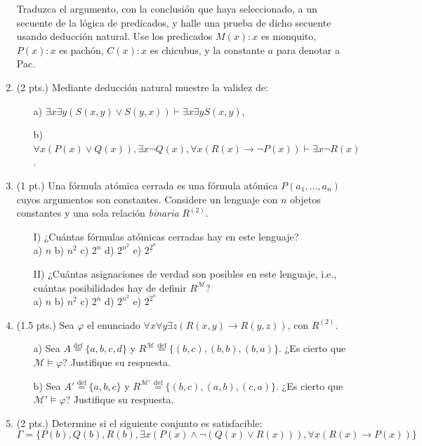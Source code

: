 \documentclass[12pt,letterpaper]{article}
\begin{document}
\begin{enumerate}
  Traduzca el argumento, con la conclusión que haya seleccionado, a un secuente de la lógica de predicados, y halle una prueba de dicho secuente usando deducción natural. Use los predicados $M(x) : x$ es monquito, $P(x) : x$ es pachón, $C(x) : x$ es chicubus, y la constante $a$ para denotar a Pac.
  \bigskip
  \bigskip
  
\item (2 pts.) Mediante deducción natural muestre la validez de:
  \begin{enumerate}
  \item[a)] $\exists x \exists y(S(x,y) \lor S(y,x)) \vdash \exists x \exists y S(x,y)$,
  \item[b)] $\forall x(P(x) \lor Q(x)), \exists x \neg Q(x), \forall x(R(x) \to \neg P(x)) \vdash \exists x \neg R(x)$.
  \end{enumerate}
  \bigskip
  \bigskip
    
\item (1 pt.) Una fórmula atómica cerrada es una fórmula atómica $P(a_1, \dots, a_n)$ cuyos argumentos son constantes. Considere un lenguaje con $n$ objetos constantes y una sola relación \textit{binaria} $R^{(2)}$.
  \begin{enumerate}
  \item[\footnotesize I)] ¿Cuántas fórmulas atómicas cerradas hay en este lenguaje?\\
    a) $n$ \hfill
    b) $n^2$ \hfill
    c) $2^n$ \hfill
    d) $2^{n^2}$ \hfill
    e) $2^{2^n}$

  \item[\footnotesize II)] ¿Cuántas asignaciones de verdad son posibles en este lenguaje, i.e., cuántas posibilidades hay de definir $R^{\mathcal{M}}$?\\
    a) $n$ \hfill
    b) $n^2$ \hfill
    c) $2^n$ \hfill
    d) $2^{n^2}$ \hfill
    e) $2^{2^n}$
  \end{enumerate}
  \bigskip
  \bigskip
  
\item (1.5 pts.) Sea $\varphi$ el enunciado $\forall x \forall y \exists z (R(x,y) \to R(y,z))$, con $R^{(2)}$.
  \begin{enumerate}
  \item[a)] Sea $A \overset{\text{def}}{=} \{a,b,c,d\}$ y $R^{\mathcal{M}} \overset{\text{def}}{=} \{(b,c), (b,b), (b,a)\}$. ¿Es cierto que $\mathcal{M} \models \varphi$? Justifique su respuesta.
  \item[b)] Sea $A' \overset{\text{def}}{=} \{a,b,c\}$ y $R^{\mathcal{M}'} \overset{\text{def}}{=} \{(b,c), (a,b), (c,a)\}$. ¿Es cierto que $\mathcal{M}' \models \varphi$? Justifique su respuesta.
  \end{enumerate}
  \bigskip
  \bigskip
  
\item (2 pts.) Determine si el siguiente conjunto es satisfacible:
  \[
  \Gamma = \{P(b), Q(b), R(b), \exists x(P(x) \land \neg(Q(x) \lor R(x))), \forall x(R(x) \to P(x))\}
  \]
  \bigskip
  \bigskip
  
\end{enumerate}
\end{document}
